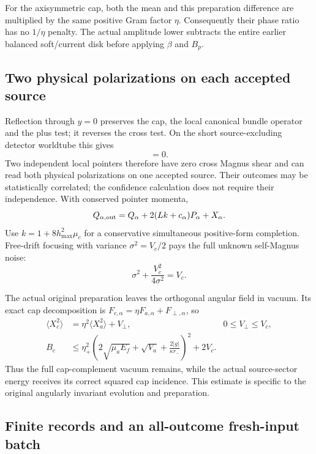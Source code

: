 For the axisymmetric cap, both the mean and this preparation difference are
multiplied by the same positive Gram factor $\eta$. Consequently their phase
ratio has no $1/\eta$ penalty. The actual amplitude lower subtracts the
entire earlier balanced soft/current disk before applying $\beta$ and $B_p$.

\subsection{Two physical polarizations on each accepted source}

Reflection through $y=0$ preserves the cap, the local canonical bundle
operator and the plus test; it reverses the cross test. On the short
source-excluding detector worldtube this gives
\begin{equation}
 [\Phi(F_+,t),\Phi(F_\times,s)]=0.
\end{equation}
Two independent local pointers therefore have zero cross Magnus shear and
can read both physical polarizations on one accepted source. Their outcomes
may be statistically correlated; the confidence calculation does not require
their independence. With conserved pointer momenta,
\begin{equation}
 Q_{\alpha,\rm out}=Q_\alpha+2(Lk+c_\alpha)P_\alpha+X_\alpha.
\end{equation}
Use $k=1+8h_{\max}^2\mu_c$ for a conservative simultaneous positive-form
completion. Free-drift focusing with variance $\sigma^2=V_c/2$ pays the full
unknown self-Magnus noise:
\begin{equation}
 \sigma^2+\frac{V_c^2}{4\sigma^2}=V_c.
\end{equation}

The actual original preparation leaves the orthogonal angular field in
vacuum. Its exact cap decomposition is
$F_{c,\alpha}=\eta F_{a,\alpha}+F_{\perp,\alpha}$, so
\begin{align}
 \langle X_c^2\rangle&=\eta^2\langle X_a^2\rangle+V_\perp,
       &0\leq V_\perp\leq V_c,\\
 B_c&\leq\eta_+^2
 \left(2\sqrt{\mu_aE_f}+\sqrt{V_a}
                         +\frac{2|g|}{\kappa r_-}\right)^2+2V_c.
\end{align}
Thus the full cap-complement vacuum remains, while the actual source-sector
energy receives its correct squared cap incidence. This estimate is specific
to the original angularly invariant evolution and preparation.

\subsection{Finite records and an all-outcome fresh-input batch}

